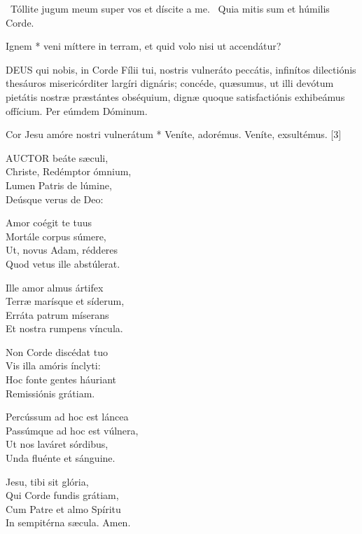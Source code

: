 \V\ Tóllite jugum meum super vos et díscite a me. \R\ Quia mitis sum et húmilis Corde.

 Ignem * veni míttere in terram, et quid volo nisi ut accendátur?


\lettrine[lines=2]{D}{EUS} qui nobis, in Corde Fílii tui, nostris vulneráto peccátis, infinítos dilectiónis thesáuros misericórditer largíri dignáris; concéde, quæsumus, ut illi devótum pietátis nostræ præstántes obséquium, dignæ quoque satisfactiónis exhibeámus offícium. Per eúmdem Dóminum.




 Cor Jesu amóre nostri vulnerátum * Veníte, adorémus.  Veníte, exsultémus. [3]


\lettrine[lines=2]{A}{UCTOR} beáte sæculi,\\
Christe, Redémptor ómnium,\\
Lumen Patris de lúmine,\\
Deúsque verus de Deo:

Amor coégit te tuus\\
Mortále corpus súmere,\\
Ut, novus Adam, rédderes\\
Quod vetus ille abstúlerat.

Ille amor almus ártifex\\
Terræ marísque et síderum,\\
Erráta patrum míserans\\
Et nostra rumpens víncula.

Non Corde discédat tuo\\
Vis illa amóris ínclyti:\\
Hoc fonte gentes háuriant\\
Remissiónis grátiam.

Percússum ad hoc est láncea\\
Passúmque ad hoc est vúlnera,\\
Ut nos laváret sórdibus,\\
Unda fluénte et sánguine.

Jesu, tibi sit glória,\\
Qui Corde fundis grátiam,\\
Cum Patre et almo Spíritu\\
In sempitérna sæcula. Amen.

